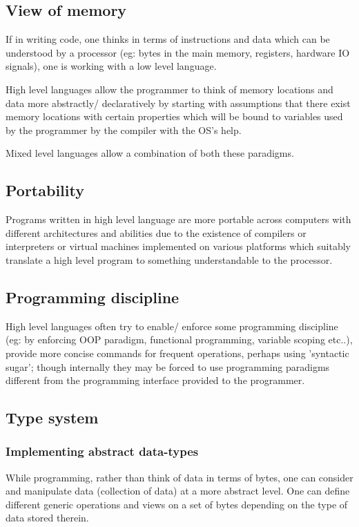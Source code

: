 \documentclass[oneside, article]{memoir}
\begin{document}
\subsection{View of memory}
If in writing code, one thinks in terms of instructions and data which can be understood by a processor (eg: bytes in the main memory, registers, hardware IO signals), one is working with a low level language.

High level languages allow the programmer to think of memory locations and data more abstractly/ declaratively by starting with assumptions that there exist memory locations with certain properties which will be bound to variables used by the programmer by the compiler with the OS's help.

Mixed level languages allow a combination of both these paradigms.

\subsection{Portability}
Programs written in high level language are more portable across computers with different architectures and abilities due to the existence of compilers or interpreters or virtual machines implemented on various platforms which suitably translate a high level program to something understandable to the processor.

\subsection{Programming discipline}
High level languages often try to enable/ enforce some programming discipline (eg: by enforcing OOP paradigm, functional programming, variable scoping etc..), provide more concise commands for frequent operations, perhaps using 'syntactic sugar'; though internally they may be forced to use programming paradigms different from the programming interface provided to the programmer.

\subsection{Type system}
\subsubsection{Implementing abstract data-types}
While programming, rather than think of data in terms of bytes, one can consider and manipulate data (collection of data) at a more abstract level. One can define different generic operations and views on a set of bytes depending on the type of data stored therein.
\end{document}
